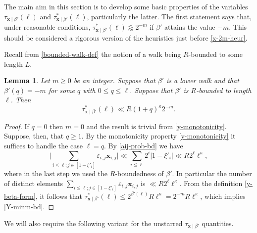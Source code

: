 \documentclass[11pt,reqno]{amsart}
\numberwithin{equation}{section}
\newtheorem{lemma}[theorem]{Lemma}
\theoremstyle{definition}
\theoremstyle{remark}
\newcommand{\mbf}{\mathbf}
\newcommand{\eps}{\varepsilon}
\renewcommand{\le}{\leqslant}
\renewcommand{\ge}{\geqslant}
\begin{document}
The main aim in this section is to develop some basic properties of the variables $\tau_{\mbf{x} \mid \beta'}(\ell)$ and $\tau^*_{\mbf{x} \mid \beta'}(\ell)$, particularly the latter. The first statement says that, under reasonable conditions, $\tau^*_{\mbf{x} \mid \beta'}(\ell) \lessapprox 2^{-m}$ if $\beta'$ attains the value $-m$. This should be considered a rigorous version of the heuristics just before \cref{x-2m-heur}.

Recall from \cref{bounded-walk-def} the notion of a walk being $R$-bounded to some length $L$.


\begin{lemma}\label{Y-upper}
Let $m \ge 0$ be an integer. Suppose that $\beta'$ is a lower walk and that $\beta'(q) = -m$ for some $q$ with $0 \le q \le \ell$. Suppose that $\beta'$ is $R$-bounded to length $\ell$. Then 
\begin{equation}\label{Y-minm-bd}  \tau^*_{\mbf{x} \mid \beta'}(\ell) \ll R (1+q)^{\kappa} 2^{-m}.\end{equation} 
\end{lemma}
\begin{proof} If $q = 0$ then $m = 0$ and the result is trivial from \cref{y-monotonicity}. Suppose, then, that $q \ge 1$. By the monotonicity property \cref{y-monotonicity} it suffices to handle the case $\ell = q$. By \cref{aij-prob-bd} we have
 \begin{equation*}\big| \sum_{i \le \ell;j \in [1 - \xi'_i]} \eps_{i,j} \mbf{x}_{i,j}\big| \ll \sum_{i \le \ell} 2^{i} |1 - \xi'_i| \ll R 2^{\ell}\ell^{\kappa},\end{equation*} where in the last step we used the $R$-boundedness of $\beta'$. In particular the number of distinct elements  $\sum_{i \le \ell;j \in [1 - \xi'_i]} \eps_{i,j} \mbf{x}_{i,j}$ is $\ll R 2^{\ell} \ell^{\kappa}$.  From the definition \cref{y-beta-form}, it follows that $\tau^*_{\mbf{x} \mid \beta'}(\ell) \le 2^{\beta'(\ell)} R \ell^{\kappa} = 2^{-m} R \ell^{\kappa}$, which implies \cref{Y-minm-bd}.
\end{proof}

We will also require the following variant for the unstarred $\tau_{\mbf{x} \mid \beta'}$ quantities. 
\end{document}
